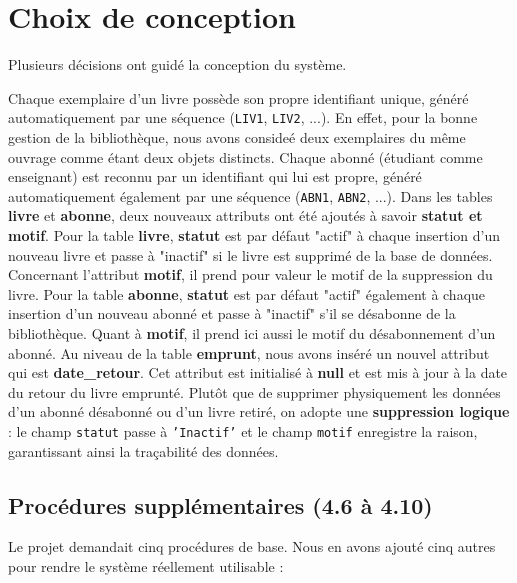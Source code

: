 \documentclass[12pt, a4paper]{report}
\begin{document}
\section{Choix de conception}
Plusieurs décisions ont guidé la conception du système.

Chaque exemplaire d'un livre possède son propre identifiant unique,
généré automatiquement par une séquence (\texttt{LIV1}, \texttt{LIV2}, ...). En effet, pour la bonne gestion de la bibliothèque, nous avons consideé deux exemplaires du même ouvrage comme étant deux objets distincts.
Chaque abonné (étudiant comme enseignant) est reconnu par un identifiant qui lui est propre, généré automatiquement également par une séquence (\texttt{ABN1}, \texttt{ABN2}, ...). 
Dans les tables \textbf{livre} et \textbf{abonne}, deux nouveaux attributs ont été ajoutés à savoir \textbf{statut et motif}. Pour la table \textbf{livre}, \textbf{statut} est par défaut "actif" à chaque insertion d'un nouveau livre et passe à "inactif" si le livre est supprimé de la base de données. Concernant l'attribut \textbf{motif}, il prend pour valeur le motif de la suppression du livre.
Pour la table \textbf{abonne}, \textbf{statut} est par défaut "actif" également à chaque insertion d'un nouveau abonné et passe à "inactif" s'il se désabonne de la bibliothèque. Quant à \textbf{motif}, il prend ici aussi le motif du désabonnement d'un abonné.
Au niveau de la table \textbf{emprunt}, nous avons inséré un nouvel attribut qui est \textbf{date\_retour}. Cet attribut est initialisé à \textbf{null} et est mis à jour à la date du retour du livre emprunté.
Plutôt que de supprimer physiquement les données d'un abonné désabonné ou
d'un livre retiré, on adopte une \textbf{suppression logique} : le champ
\texttt{statut} passe à \texttt{'Inactif'} et le champ \texttt{motif}
enregistre la raison, garantissant ainsi la traçabilité des données. 

\subsection*{Procédures supplémentaires (4.6 à 4.10)}

Le projet demandait cinq procédures de base. Nous en avons ajouté cinq autres
pour rendre le système réellement utilisable :
\end{document}
